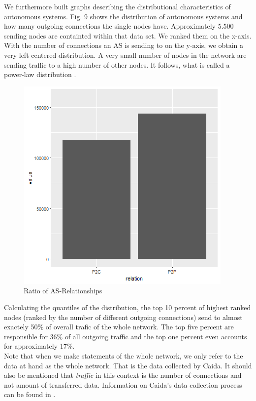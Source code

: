 \documentclass[conference, 11pt]{IEEEtran}
\begin{document}
We furthermore built graphs describing the distributional characteristics of autonomous systems. Fig. 9 shows the distribution of autonomous systems and how many outgoing connections the single nodes have. Approximately 5.500 sending nodes are containted within that data set. We ranked them on the x-axis. With the number of connections an AS is sending to on the y-axis, we obtain a very left centered distribution. A very small number of nodes in the network are sending traffic to a high number of other nodes. It follows, what is called a power-law distribution  \cite{powerlawCitation}.

\vspace{0.5cm}
\begin{figure}[htbp]
\centerline{\includegraphics[scale=0.45]{Graphics/relationspeerandprovider.png}}
\caption{Ratio of AS-Relationships }
\label{fig}
\end{figure}
\vspace{0.5cm}

 Calculating the quantiles of the distribution, the top 10 percent of highest ranked nodes (ranked by the number of different outgoing connections) send to almost exactely 50\% of overall trafic of the whole network. The top five percent are responsible for 36\% of all outgoing traffic and the top one percent even accounts for approximately 17\%. \\ \linebreak Note that when we make statements of the whole network, we only refer to the data at hand as the whole network. That is the data collected by Caida. It should also be mentioned that \textit{traffic} in this context is the number of connections and not amount of transferred data. Information on Caida's data collection process can be found in \cite{CaidaDataCollection} . \\ \linebreak
\end{document}
